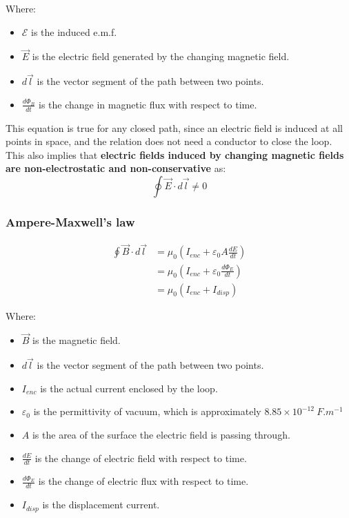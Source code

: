\documentclass[11pt]{article}
\begin{document}
Where:
\begin{itemize}
\item \(\mathcal{E}\) is the induced e.m.f.
\item \(\vec{E}\) is the electric field generated by the changing magnetic field.
\item \(d \vec{l}\) is the vector segment of the path between two points.
\item \(\frac{d \Phi_B}{dt}\) is the change in magnetic flux with respect to time.
\end{itemize}

This equation is true for any closed path, since an electric field is induced at all points in space, and the relation does not need a conductor to close the loop. This also implies that \textbf{electric fields induced by changing magnetic fields are non-electrostatic and non-conservative} as:
\[\oint \vec{E} \cdot d \vec{l} \ne 0\]

\newpage

\subsubsection{Ampere-Maxwell's law}
\label{sec:org34cff03}

\begin{align*}
\oint \vec{B} \cdot d \vec{l} &= \mu_0 \left(I_{enc} + \varepsilon_0 A \frac{dE}{dt} \right) \\
&= \mu_0 \left(I_{enc} + \varepsilon_0 \frac{d \Phi_E}{dt} \right) \\
&= \mu_0 (I_{enc} + I_{disp})
\end{align*}

Where:
\begin{itemize}
\item \(\vec{B}\) is the magnetic field.
\item \(d \vec{l}\) is the vector segment of the path between two points.
\item \(I_{enc}\) is the actual current enclosed by the loop.
\item \(\varepsilon_0\) is the permittivity of vacuum, which is approximately \(8.85 \times 10^{-12} \ \unit{F.m^{-1}}\)
\item \(A\) is the area of the surface the electric field is passing through.
\item \(\frac{dE}{dt}\) is the change of electric field with respect to time.
\item \(\frac{d \Phi_E}{dt}\) is the change of electric flux with respect to time.
\item \(I_{disp}\) is the displacement current.
\end{itemize}
\end{document}

